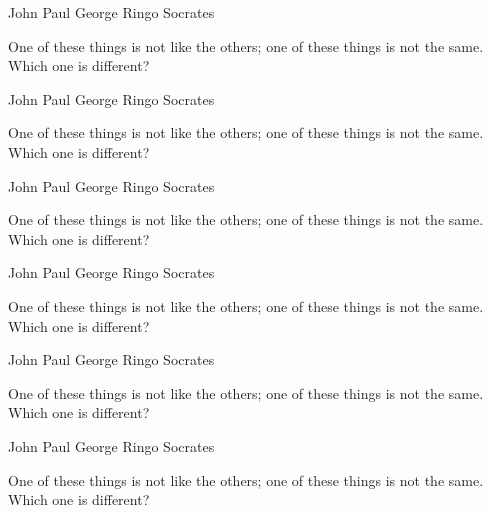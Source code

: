 \documentclass[answers,addpoints]{exam}
\begin{document}
\begin{questions}
\begin{randomizeoneparcheckboxes}[nokeeplast]
\choice John
\choice Paul
\choice George
\choice Ringo
\CorrectChoice Socrates
\end{randomizeoneparcheckboxes}

\question[5]
One of these things is not like the others; one of these
things is not the same. Which one is different?

\begin{randomizeoneparcheckboxes}[nokeeplast]
\choice John
\choice Paul
\choice George
\choice Ringo
\CorrectChoice Socrates
\end{randomizeoneparcheckboxes}

\question[5]
One of these things is not like the others; one of these
things is not the same. Which one is different?

\begin{randomizeoneparcheckboxes}
\choice John
\choice Paul
\choice George
\choice Ringo
\CorrectChoice Socrates
\end{randomizeoneparcheckboxes}

\question[5]
One of these things is not like the others; one of these
things is not the same. Which one is different?

\begin{randomizechoices}
\choice John
\choice Paul
\choice George
\choice Ringo
\CorrectChoice Socrates
\end{randomizechoices}

\question[5]
One of these things is not like the others; one of these
things is not the same. Which one is different?

\begin{choices}
\choice John
\choice Paul
\choice George
\choice Ringo
\CorrectChoice Socrates
\end{choices}

\question[5]
One of these things is not like the others; one of these
things is not the same. Which one is different?

\begin{randomizeoneparchoices}[keeplast]
\choice John
\choice Paul
\choice George
\choice Ringo
\CorrectChoice Socrates
\end{randomizeoneparchoices}

\question[5]
One of these things is not like the others; one of these
things is not the same. Which one is different?


\end{questions}
\end{document}
